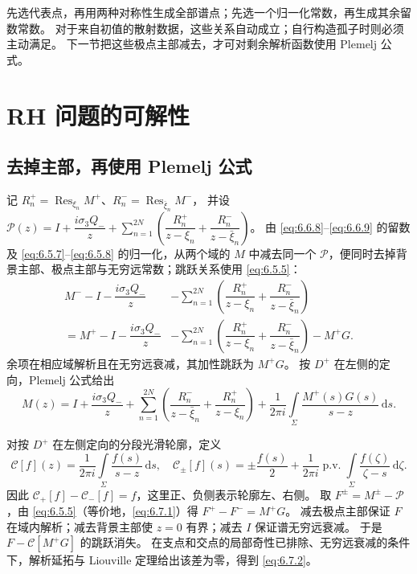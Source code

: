 \documentclass[lang=cn,scheme=chinese,mode=simple,device=normal,color=blue,
math=cm,thmcnt=section,12pt]{elegantbook}
\DeclareMathOperator*{\Res}{Res}
\newcommand{\dd}{\,\mathrm{d}}
\newcommand{\eqq}[2]{\tag{#1}\label{eq:#1}#2}
\begin{document}
\begin{callout}
    先选代表点，再用两种对称性生成全部谱点；先选一个归一化常数，再生成其余留数常数。
    对于来自初值的散射数据，这些关系自动成立；自行构造孤子时则必须主动满足。
    下一节把这些极点主部减去，才可对剩余解析函数使用 Plemelj 公式。
\end{callout}

\section{RH 问题的可解性}
\subsection{去掉主部，再使用 Plemelj 公式}
记 $R_n^+=\Res_{\xi_n}M^+$、$R_n^-=\Res_{\bar\xi_n}M^-$，
并设
$\mathcal P(z)=I+\dfrac{i\sigma_3Q_-}{z}+
    \displaystyle\sum\limits_{n=1}^{2N}(\dfrac{R_n^+}{z-\xi_n}+\dfrac{R_n^-}{z-\bar\xi_n})$。
由 \eqref{eq:6.6.8}--\eqref{eq:6.6.9} 的留数及 \eqref{eq:6.5.7}--\eqref{eq:6.5.8} 的归一化，从两个域的 $M$ 中减去同一个 $\mathcal P$，便同时去掉背景主部、极点主部与无穷远常数；跳跃关系使用 \eqref{eq:6.5.5}：
\begin{equation}\eqq{6.7.1}{\begin{aligned}
            M^- -I-\dfrac{i\sigma_3Q_-}{z}
             & -\sum\limits_{n=1}^{2N}\left(\dfrac{R_n^+}{z-\xi_n}+\dfrac{R_n^-}{z-\bar\xi_n}\right)       \\
            =M^+ -I-\dfrac{i\sigma_3Q_-}{z}
             & -\sum\limits_{n=1}^{2N}\left(\dfrac{R_n^+}{z-\xi_n}+\dfrac{R_n^-}{z-\bar\xi_n}\right)-M^+G.
        \end{aligned}}\end{equation}
余项在相应域解析且在无穷远衰减，其加性跳跃为 $M^+G$。
按 $D^+$ 在左侧的定向，Plemelj 公式给出
\begin{equation}
    \eqq{6.7.2}{M(z)=I+\dfrac{i\sigma_3Q_-}{z}
        +\sum\limits_{n=1}^{2N}\left(\dfrac{R_n^-}{z-\bar\xi_n}+\dfrac{R_n^+}{z-\xi_n}\right)
        +\dfrac{1}{2\pi i}\int\limits_\Sigma\dfrac{M^+(s)G(s)}{s-z}\dd s.}
\end{equation}

\begin{callout}
    对按 $D^+$ 在左侧定向的分段光滑轮廓，定义
    \[
        \mathcal C[f](z)=\dfrac{1}{2\pi i}\int\limits_\Sigma\dfrac{f(s)}{s-z}\dd s,\quad
        \mathcal C_\pm[f](s)=\pm\dfrac{f(s)}{2}
        +\dfrac{1}{2\pi i}\operatorname{p.v.}\int\limits_\Sigma\dfrac{f(\zeta)}{\zeta-s}\dd\zeta.
    \]
    因此 $\mathcal C_+[f]-\mathcal C_-[f]=f$，这里正、负侧表示轮廓左、右侧。
    取 $F^\pm=M^\pm-\mathcal P$，由 \eqref{eq:6.5.5}（等价地，\eqref{eq:6.7.1}）得
    $F^+-F^-=M^+G$。
    减去极点主部保证 $F$ 在域内解析；减去背景主部使 $z=0$ 有界；减去 $I$ 保证谱无穷远衰减。
    于是 $F-\mathcal C[M^+G]$ 的跳跃消失。
    在支点和交点的局部奇性已排除、无穷远衰减的条件下，解析延拓与 Liouville 定理给出该差为零，得到 \eqref{eq:6.7.2}。

\end{callout}
\end{document}
